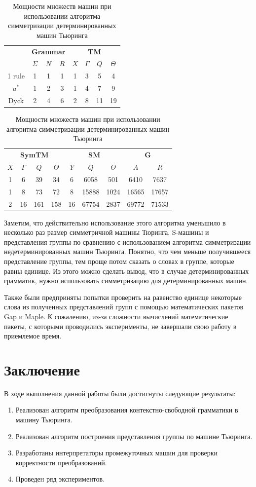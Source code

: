 \documentclass[14pt]{matmex-diploma-custom}
\begin{document}
\begin{table}[H]
\centering
\begin{tabular}{|c|
c|c|c|
c|c|c|c|}
\hline
&
\multicolumn{3}{|c|}{\textbf{Grammar}}&
\multicolumn{4}{|c|}{\textbf{TM}}\\
\cline{2-8}
&$\Sigma$&$N$&$R$
&$X$&$\Gamma$&$Q$&$\Theta$\\
\hline
1 rule
&1&1&1
&1&3&5&4\\
\hline
$a^*$
&1&2&3
&1&4&7&9\\
\hline
Dyck
&2&4&6
&2&8&11&19\\
\hline
\end{tabular}
\begin{tabular}{
|c|c|c|c|
c|c|c|
c|c|}
\hline
\multicolumn{4}{|c|}{\textbf{SymTM}}&
\multicolumn{3}{|c|}{\textbf{SM}}&
\multicolumn{2}{|c|}{\textbf{G}}\\
\cline{1-9}
$X$&$\Gamma$&$Q$&$\Theta$
&$Y$&$Q$&$\Theta$
&$A$&$R$\\
\hline
1&6&39&34
&6&6058&501
&6410&7637\\
\hline
1&8&73&72
&8&15888&1024
&16565&17657\\
\hline
2&16&161&158
&16&67754&2837
&69772&71533\\
\hline
\end{tabular}
\caption{Мощности множеств машин при использовании алгоритма симметризации детерминированных машин Тьюринга}
\label{tab:countdtm}
\end{table}

Заметим, что действительно использование этого алгоритма уменьшило в несколько раз размер симметричной машины Тюринга, S-машины и представления группы по сравнению с использованием алгоритма симметризации недетерминированных машин Тьюринга. Понятно, что чем меньше получившееся представление группы, тем проще потом сказать о словах в группе, которые равны единице. Из этого можно сделать вывод, что в случае детерминированных грамматик, нужно использовать симметризацию для детерминированных машин.

Также были предприняты попытки проверить на равенство единице некоторые слова из полученных представлений групп с помощью математических пакетов Gap и Maple. К сожалению, из-за сложности вычислений математические пакеты, с которыми проводились эксперименты, не завершали свою работу в приемлемое время.

\section*{Заключение}
В ходе выполнения данной работы были достигнуты следующие результаты:
\begin{enumerate}
    \item Реализован алгоритм преобразования контекстно-свободной грамматики в машину Тьюринга.
    \item Реализован алгоритм построения представления группы по машине Тьюринга.
    \item Разработаны интерпретаторы промежуточных машин для проверки корректности преобразований.
    \item Проведен ряд экспериментов.
\end{enumerate}
\end{document}
